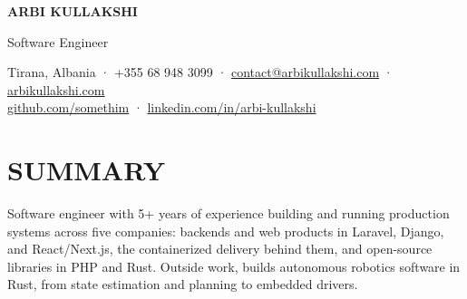 \documentclass[10pt,a4paper]{article}
\begin{document}
\begin{center}
{\fontsize{22}{24}\selectfont\bfseries ARBI KULLAKSHI}\par\vspace{3pt}
{\fontsize{11}{13}\selectfont Software Engineer}\par\vspace{3pt}
{\fontsize{8.5}{10}\selectfont Tirana, Albania  ·  +355 68 948 3099  ·  \href{mailto:contact@arbikullakshi.com}{contact@arbikullakshi.com}  ·  \href{https://arbikullakshi.com}{arbikullakshi.com}\\
\href{https://github.com/somethim}{github.com/somethim}  ·  \href{https://www.linkedin.com/in/arbi-kullakshi/}{linkedin.com/in/arbi-kullakshi}\par}
\end{center}
\vspace{-8pt}
\section*{SUMMARY}
Software engineer with 5+ years of experience building and running production systems across five companies: backends and web products in Laravel, Django, and React/Next.js, the containerized delivery behind them, and open-source libraries in PHP and Rust. Outside work, builds autonomous robotics software in Rust, from state estimation and planning to embedded drivers.\par
\end{document}
